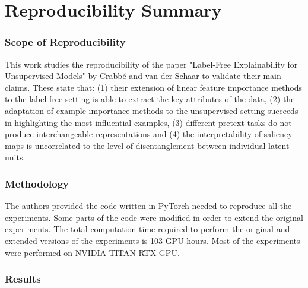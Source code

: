 \section*{\centering Reproducibility Summary}


\subsubsection*{Scope of Reproducibility}

This work studies the reproducibility of the paper "Label-Free Explainability for Unsupervised Models" by Crabb{\'e} and van der Schaar to validate their main claims. These state that: (1) their extension of linear feature importance methods to the label-free setting is able to extract the key attributes of the data, (2) the adaptation of example importance methods to the unsupervised setting succeeds in highlighting the most influential examples, (3) different pretext tasks do not produce interchangeable representations and (4) the interpretability of saliency maps is uncorrelated to the level of disentanglement between individual latent units. 

\subsubsection*{Methodology}

The authors provided the code written in PyTorch needed to reproduce all the experiments. Some parts of the code were modified in order to extend the original experiments. The total computation time required to perform the original and extended versions of the experiments is 103 GPU hours. Most of the experiments were performed on NVIDIA TITAN RTX GPU.

\subsubsection*{Results}

